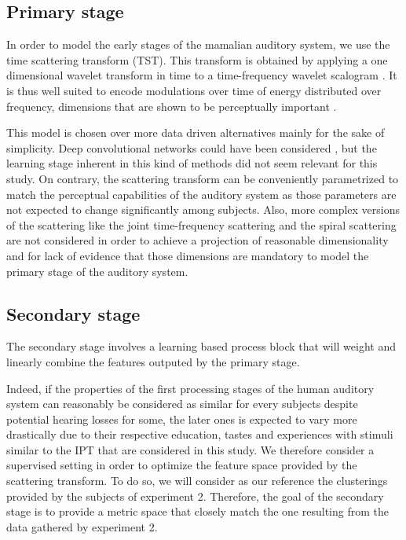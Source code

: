 \documentclass{article}
\newcommand{\ipt}{IPT\xspace}
\begin{document}
\subsection{Primary stage}

In order to model the early stages of the mamalian auditory system, we use the time scattering transform (TST). This transform is obtained by applying a one dimensional
wavelet transform in time to a time-frequency wavelet scalogram \cite{anden2014deep}. It is thus well suited to encode modulations over time of energy distributed over frequency, dimensions that are shown to be perceptually important \cite{dau1997modeling}.

This model is chosen over more data driven alternatives mainly for the sake of simplicity. Deep convolutional networks could have been considered \cite{lee2009unsupervised}, but the learning stage inherent in this kind of methods did not seem relevant for this study. On contrary, the scattering transform can be conveniently parametrized to match the perceptual capabilities of the auditory system as those parameters are not expected to change significantly among subjects. Also, more complex versions of the scattering like the joint time-frequency scattering \cite{anden2015joint} and the spiral scattering \cite{lostanlen2016wavelet} are not considered in order to achieve a projection of reasonable dimensionality and for lack of evidence that those dimensions are mandatory to model the primary stage of the auditory system.

\subsection{Secondary stage}

The secondary stage involves a learning based process block that will weight and linearly combine the features outputed by the primary stage.

Indeed, if the properties of the first processing stages of the human auditory system can reasonably be considered as similar for every subjects despite potential hearing losses for some, the later ones is expected to vary more drastically due to their respective education, tastes and experiences with stimuli similar to the \ipt that are considered in this study. We therefore consider a supervised setting in order to optimize the feature space provided by the scattering transform. To do so, we will consider as our reference the clusterings provided by the subjects of experiment 2. Therefore, the goal of the secondary stage is to provide a metric space that closely match the one resulting from the data gathered by experiment 2.
\end{document}
